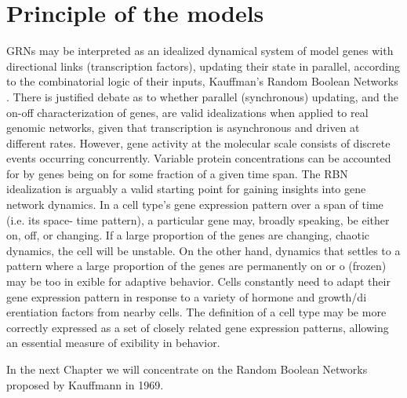 \section{Principle of the models}
GRNs may be interpreted as an idealized dynamical system of
model genes with directional links (transcription factors), updating
their state in parallel, according to the combinatorial logic of their
inputs, Kauffman's Random Boolean Networks \cite{K1}\cite{K7}.
There is justified debate as to whether parallel (synchronous) updating,
and the on-off characterization of genes, are valid idealizations when applied
to real genomic networks, given that transcription is asynchronous and driven
at different rates. However, gene activity at the molecular scale consists of
discrete events occurring concurrently. Variable protein concentrations can be
accounted for by genes being on for some fraction of a given time span. The
RBN idealization is arguably a valid starting point for gaining insights into
gene network dynamics.
In a cell type's gene expression pattern over a span of time (i.e. its space-
time pattern), a particular gene may, broadly speaking, be either on, off, or
changing. If a large proportion of the genes are changing, chaotic dynamics, the cell will be unstable. On the other hand, dynamics that settles to
a pattern where a large proportion of the genes are permanently on or o
(frozen) may be too in exible for adaptive behavior. Cells constantly need to
adapt their gene expression pattern in response to a variety of hormone and
growth/di erentiation factors from nearby cells. The definition of a cell type
may be more correctly expressed as a set of closely related gene expression
patterns, allowing an essential measure of exibility in behavior.

In the next Chapter we will concentrate on the Random Boolean Networks proposed by Kauffmann in 1969.
